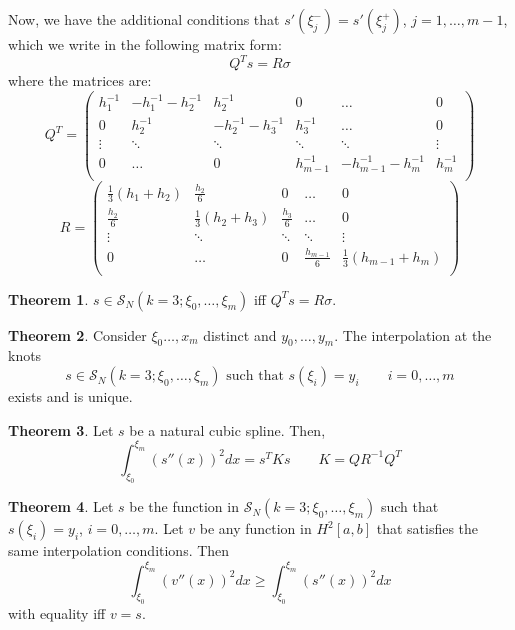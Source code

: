 \documentclass[12pt, openany]{report}
\theoremstyle{definition}
\newtheorem{thm}{Theorem}[chapter]
\begin{document}
Now, we have the additional conditions that $s'(\xi_j^-)=s'(\xi_j^+)$, $j=1,\dots,m-1$, which we write in the following matrix form:
\begin{equation}
    Q^Ts=R\sigma
\end{equation}
where the matrices are:
\begin{equation}
    Q^T = \begin{pmatrix}
        h_1^{-1} & -h_1^{-1}-h_2^{-1} & h_2^{-1} & 0 & \dots & 0\\
        0 & h_2^{-1} & -h_2^{-1}-h_3^{-1} & h_3^{-1} & \dots & 0\\
        \vdots & \ddots & \ddots & \ddots & \ddots & \vdots \\
        0 & \dots & 0 & h_{m-1}^{-1} & -h_{m-1}^{-1}-h_m^{-1} & h_m^{-1}\\
    \end{pmatrix}
\end{equation}
\begin{equation}
    R = \begin{pmatrix}
        \frac{1}{3} (h_1+h_2) & \frac{h_2}{6} & 0 & \dots & 0\\
        \frac{h_2}{6} & \frac{1}{3}(h_2+h_3) & \frac{h_3}{6} & \dots & 0\\
        \vdots & \ddots & \ddots  & \ddots & \vdots\\
        0 & \dots & 0 & \frac{h_{m-1}}{6} & \frac{1}{3}(h_{m-1}+h_m)\\
    \end{pmatrix}
\end{equation}
\begin{thm}
    $s\in \mathcal{S}_N(k=3;\xi_0,\dots,\xi_m)$ iff $Q^Ts=R\sigma$.
\end{thm}
\begin{thm}
    Consider $\xi_0\dots,x_m$ distinct and $y_0,\dots,y_m$. The interpolation at the knots 
    \begin{equation}
        s\in \mathcal{S}_N(k=3;\xi_0,\dots,\xi_m) \text{ such that }s(\xi_i) = y_i \qquad i=0,\dots, m
    \end{equation}
    exists and is unique.
\end{thm}
\begin{thm}
    Let $s$ be a natural cubic spline. Then, 
    \begin{equation}
        \int_{\xi_0}^{\xi_m} \left(s''(x)\right)^2dx = s^TKs \qquad K = QR^{-1}Q^T
    \end{equation}
\end{thm}
\begin{thm}
    Let $s$ be the function in $\mathcal{S}_N(k=3;\xi_0,\dots,\xi_m)$ such that $s(\xi_i)=y_i$, $i=0,\dots,m$. Let $v$ be any function in $H^2[a,b]$ that satisfies the same interpolation conditions. Then 
    \begin{equation}
        \int_{\xi_0}^{\xi_m} \left(v''(x)\right)^2dx\ge \int_{\xi_0}^{\xi_m} \left(s''(x)\right)^2dx
    \end{equation}
    with equality iff $v=s$.
\end{thm}
\end{document}
